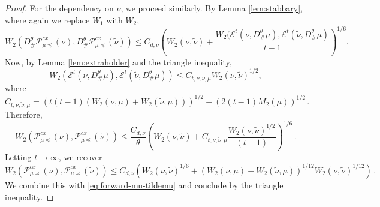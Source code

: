 \documentclass[12pt]{amsart}
\begin{document}
\begin{proof}
For the dependency on $\nu$, we proceed similarly.
By Lemma \ref{lem:stabbary}, where again we replace $W_1$ with $W_2$,
\[
W_2(D^\theta_\#\mathscr{P}_{\mu \preceq }^{cx}(\nu), D^\theta_\#\mathscr{P}_{\mu \preceq }^{cx}(\tilde{\nu}))\leq C_{d,\nu} \left( W_2(\nu,\tilde{\nu})+ \frac{W_2(\mathscr{E}^t(\nu,  D^\theta_\#\mu),\mathscr{E}^t(\tilde{\nu},  D^\theta_\#\mu)}{t-1}\right)^{1/6}.
\]
Now, by Lemma \ref{lem:extraholder}  and the triangle inequality,  \[W_2(\mathscr{E}^t(\nu, D^\theta_\# \mu),\mathscr{E}^t( \tilde{\nu},  D^\theta_\#\mu))\leq C_{t,\nu,\tilde{\nu},\mu} W_2(\nu,\tilde{\nu})^{1/2},\] where
\[
C_{t,\nu,\tilde{\nu},\mu}= (t(t-1)(W_2(\nu,\mu) +W_2(\tilde{\nu},\mu)))^{1/2} +(2(t-1)M_2(\mu))^{1/2}\,.
\]
Therefore,
\[
W_2(\mathscr{P}_{\mu \preceq }^{cx}(\nu),\mathscr{P}_{\mu \preceq }^{cx}(\tilde{\nu}))\leq \frac{C_{d,\nu}}{\theta} \left( W_2(\nu,\tilde{\nu})+ C_{t,\nu,\tilde{\nu},\mu} \frac{W_2(\nu, \tilde{\nu})^{1/2}}{(t-1)}\right)^{1/6}\,.
\]
Letting $t\rightarrow \infty$, we recover
\[
W_2(\mathscr{P}_{\mu \preceq }^{cx}(\nu),\mathscr{P}_{\mu \preceq }^{cx}(\tilde{\nu}))\leq C_{d,\nu} \left( W_2(\nu, \tilde{\nu})^{1/6} +(W_2(\nu,\mu) +W_2(\tilde{\nu},\mu))^{1/12}  W_2(\nu, \tilde{\nu})^{1/12}\right)\,.
\]
We combine this with \eqref{eq:forward-mu-tildemu}
and conclude by the triangle inequality.
\end{proof}



   
\end{document}
